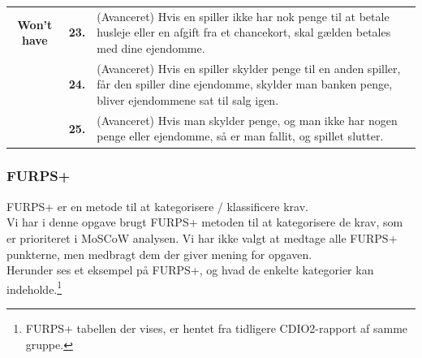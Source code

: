 \begin{center}
\begin{tabular}{ || c | l | p{11.5cm} ||}
    \cline{2-3}
    \textbf{Won't have}
    &
    \textbf{23.}
    &
    (Avanceret) Hvis en spiller ikke har nok penge til at betale husleje eller en afgift fra et chancekort, skal gælden betales med dine ejendomme.    \\

    \cline{2-3}
    &
    \textbf{24.}
    &
    (Avanceret) Hvis en spiller skylder penge til en anden spiller, får den spiller dine ejendomme, skylder man banken penge, bliver ejendommene sat til salg igen.    \\

    \cline{2-3}
    &
    \textbf{25.}
    &
    (Avanceret) Hvis man skylder penge, og man ikke har nogen penge eller ejendomme, så er man fallit, og spillet slutter.
    \\

    \hline
    \hline
    \end{tabular}
\end{center}

\subsubsection{FURPS+}

FURPS+ er en metode til at kategorisere / klassificere krav. \\
Vi har i denne opgave brugt FURPS+ metoden til at kategorisere de krav, som er prioriteret i MoSCoW analysen.
Vi har ikke valgt at medtage alle FURPS+ punkterne, men medbragt dem der giver mening for opgaven. \\
Herunder ses et eksempel på FURPS+, og hvad de enkelte kategorier kan indeholde.\footnote{FURPS+ tabellen der vises, er hentet fra tidligere CDIO2-rapport af samme gruppe.}

